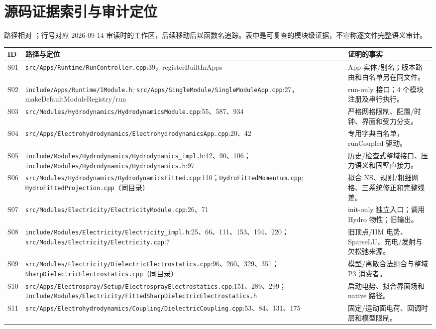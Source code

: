 \documentclass[UTF8,a4paper,11pt,fontset=fandol]{ctexart}
\numberwithin{equation}{section}
\newcommand{\code}[1]{\nolinkurl{#1}}
\begin{document}
\section{源码证据索引与审计定位}\label{sec:sources}
路径相对 ；行号对应 2026-09-14 审读时的工作区，后续移动后以函数名追踪。表中是可复查的模块级证据，不宣称逐文件完整语义审计。
\small
\begin{longtable}{@{}P{.07\textwidth}P{.60\textwidth}P{.26\textwidth}@{}}
\toprule ID & 路径与定位 & 证明的事实\\\midrule\endhead
S01 & \code{src/Apps/Runtime/RunController.cpp}:39，registerBuiltInApps & App 实体/别名；版本路由和白名单另在同文件。\\
S02 & \code{include/Apps/Runtime/IModule.h}; \code{src/Apps/SingleModule/SingleModuleApp.cpp}:27，makeDefaultModuleRegistry/run & run-only 接口；4 个模块注册及串行执行。\\
S03 & \code{src/Modules/Hydrodynamics/HydrodynamicsModule.cpp}:55、587、934 & 严格网格限制、配置/时钟、界面和受力分支。\\
S04 & \code{src/Apps/Electrohydrodynamics/ElectrohydrodynamicsApp.cpp}:20、42 & 专用字典白名单，runCoupled 驱动。\\
S05 & \code{include/Modules/Hydrodynamics/Hydrodynamics_impl.h}:42、90、106；\code{include/Modules/Hydrodynamics/Hydrodynamics.h}:97 & 历史/检查式整域接口、压力语义和固壁直接力。\\
S06 & \code{src/Modules/Hydrodynamics/HydrodynamicsFitted.cpp}:110；\code{HydroFittedMomentum.cpp}; \code{HydroFittedProjection.cpp}（同目录） & 拟合 NS、规则/粗细网格、三系统修正和完整残差。\\
S07 & \code{src/Modules/Electricity/ElectricityModule.cpp}:26、71 & init-only 独立入口；调用 Hydro 物性；旧输出。\\
S08 & \code{include/Modules/Electricity/Electricity_impl.h}:25、66、111、153、194、220；\code{src/Modules/Electricity/Electricity.cpp}:7 & 旧顶点/IIM 电势、SparseLU、充电/发射与欠松弛来源。\\
S09 & \code{src/Modules/Electricity/DielectricElectrostatics.cpp}:96、260、329、351；\code{SharpDielectricElectrostatics.cpp}（同目录） & 模型/离散合法组合与整域 P3 消费者。\\
S10 & \code{src/Apps/Electrospray/Setup/ElectrosprayElectrostatics.cpp}:151、289、299；\code{include/Modules/Electricity/FittedSharpDielectricElectrostatics.h} & 启动电势、拟合界面场和 native 路径。\\
S11 & \code{src/Apps/Electrohydrodynamics/Coupling/DielectricCoupling.cpp}:53、84、131、175 & 固定/运动面电荷、回调时层和模型限制。\\

\end{longtable}
\end{document}
